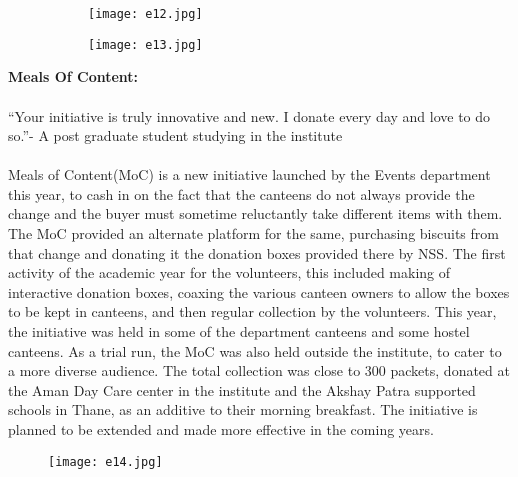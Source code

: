 \begin{figure}[H]
\centering
\begin{subfigure}{.55\textwidth}
 \centering
 \texttt{[image: e12.jpg]}
\end{subfigure}%
\begin{subfigure}{.5\textwidth}
\texttt{[image: e13.jpg]}
\end{subfigure}
\end{figure}

\noindent \textbf {\Large \linebreak \linebreak \linebreak \linebreak \linebreak \linebreak  Meals Of Content:}\\ \\“Your initiative is truly innovative and new. I donate every day and love to do so.”- A post graduate student studying in the institute \\ \\
Meals of Content(MoC) is a new initiative launched by the Events department this year, to cash in on the fact that the canteens do not always provide the change and the buyer must sometime reluctantly take different items with them. The MoC provided an alternate platform for the same, purchasing biscuits from that change and donating it the donation boxes provided there by NSS. The first activity of the academic year for the volunteers, this included making of interactive donation boxes, coaxing the various canteen owners to allow the boxes to be kept in canteens, and then regular collection by the volunteers. This year, the initiative was held in some of the department canteens and some hostel canteens. As a trial run, the MoC was also held outside the institute, to cater to a more diverse audience. The total collection was close to 300 packets, donated at the Aman Day Care center in the institute and the Akshay Patra supported schools in Thane, as an additive to their morning breakfast. The initiative is planned to be extended and made more effective in the coming years.

\begin{figure}[H]
\centering
\texttt{[image: e14.jpg]}
\end{figure}

